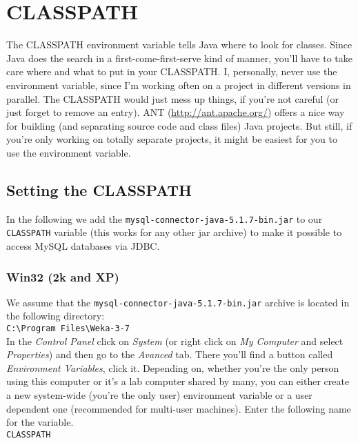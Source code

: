 
\section{CLASSPATH}
\label{CLASSPATH}
The CLASSPATH environment variable tells Java where to look for
classes. Since Java does the search in a first-come-first-serve kind
of manner, you'll have to take care where and what to put in your
CLASSPATH. I, personally, never use the environment variable, since
I'm working often on a project in different versions in parallel. The
CLASSPATH would just mess up things, if you're not careful (or just
forget to remove an entry). ANT (\url{http://ant.apache.org/}{}) offers
a nice way for building (and separating source code and class files)
Java projects. But still, if you're only working on totally separate
projects, it might be easiest for you to use the environment variable.

\subsection{Setting the CLASSPATH} 
In the following we add the \verb=mysql-connector-java-5.1.7-bin.jar=
to our \verb=CLASSPATH= variable (this works for any other jar archive) to make it possible to
access MySQL databases via JDBC.

\subsubsection*{Win32 (2k and XP)}
We assume that the \verb=mysql-connector-java-5.1.7-bin.jar= archive is located in the following directory:\\

\verb=C:\Program Files\Weka-3-7=\\

\noindent In the \emph{Control Panel} click on \emph{System} (or right click on
\emph{My Computer} and select \emph{Properties}) and then go to the
\emph{Avanced} tab. There you'll find a button called \emph{Environment
Variables}, click it. Depending on, whether you're the only person
using this computer or it's a lab computer shared by many, you can
either create a new system-wide (you're the only user) environment
variable or a user dependent one (recommended for multi-user
machines). Enter the following name for the variable.\\

\verb=CLASSPATH=\\

